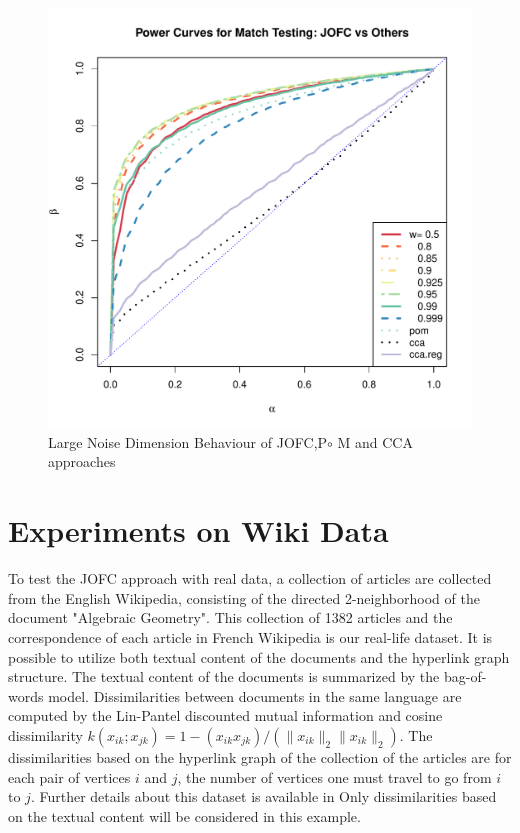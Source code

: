 \documentclass[12pt,oneside,final]{thesis}\usepackage[]{graphicx}\usepackage[]{color}
\begin{document}
\begin{figure}
\includegraphics[scale=0.8]{MVN_JOFC_q_90_c_0_001}
\caption{Large Noise Dimension Behaviour of JOFC,P$\circ$ M and CCA approaches}
\label{fig:largeq}
\end{figure}



\section{Experiments on Wiki Data}
To test the JOFC approach with real data, a collection of articles are collected from the English Wikipedia, consisting of the
 directed 2-neighborhood of the document "Algebraic Geometry". 
   This  collection of 1382 articles and the correspondence of each article in French 
Wikipedia is our real-life dataset. It is possible to utilize both textual content of the documents and the hyperlink graph structure. The textual content of the documents is summarized by the bag-of-words model. Dissimilarities between documents  in the same language are computed by the Lin-Pantel discounted mutual information \cite{LinPantel,PantelLin}
 and cosine dissimilarity $k(x_{ik}; x_{jk}) = 1 - (x_{ik} x_{jk})/(\|x_{ik}\|_2\|x_{ik}\|_2)$. 
 The dissimilarities based on the hyperlink graph of the collection of the articles are 
 for each pair of vertices $i$ and $j$, the number of vertices one must travel to go from $i$ to $j$.  Further details about this dataset is available in \cite{Zhiliang_disparate}     
Only  dissimilarities based on the textual content will be considered in this example.
   
\end{document}
